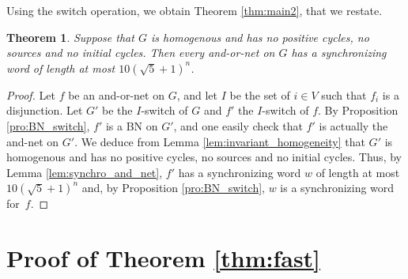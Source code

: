 \documentclass[11pt,letter]{article}
\newtheorem{theorem}{Theorem}
\begin{document}
Using the switch operation, we obtain Theorem \ref{thm:main2}, that we restate.

\setcounter{theorem}{3}

\begin{theorem}
Suppose that $G$ is homogenous and has no positive cycles, no sources and no initial cycles. Then every and-or-net on $G$ has a synchronizing word of length at most $10(\sqrt{5}+1)^n$.
\end{theorem}

\begin{proof}
Let $f$ be an and-or-net on $G$, and let $I$ be the set of $i\in V$ such that $f_i$ is a disjunction. Let $G'$ be the $I$-switch of $G$ and $f'$ the $I$-switch of $f$. By Proposition \ref{pro:BN_switch}, $f'$ is a BN on $G'$, and one easily check that $f'$ is actually the and-net on $G'$. We deduce from Lemma \ref{lem:invariant_homogeneity} that $G'$ is homogenous and has no positive cycles, no sources and no initial cycles. Thus, by Lemma \ref{lem:synchro_and_net}, $f'$ has a synchronizing word $w$ of length at most $10(\sqrt{5}+1)^n$ and, by Proposition \ref{pro:BN_switch}, $w$ is a synchronizing word for~$f$.
\end{proof}

\section{Proof of Theorem \ref{thm:fast}}\label{sec:fast}
\end{document}
